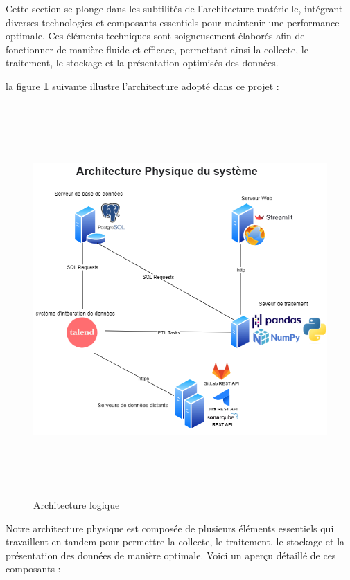     \par Cette section se plonge dans les subtilités de l'architecture matérielle, intégrant diverses technologies et composants essentiels pour maintenir une performance optimale. Ces éléments techniques sont soigneusement élaborés afin de fonctionner de manière fluide et efficace, permettant ainsi la collecte, le traitement, le stockage et la présentation optimisés des données.
\par la figure \textbf{\ref{fig:arch_phy}} suivante illustre l'architecture adopté dans ce projet : 
        \begin{figure}[H]
        \centering
        \includegraphics[width = 17cm , height=15cm]{img/techno/archi_phy.png}
        \caption{Architecture logique}
        \label{fig:arch_phy}
        \end{figure}
        \par Notre architecture physique est composée de plusieurs éléments essentiels qui travaillent en tandem pour permettre la collecte, le traitement, le stockage et la présentation des données de manière optimale. Voici un aperçu détaillé de ces composants :
